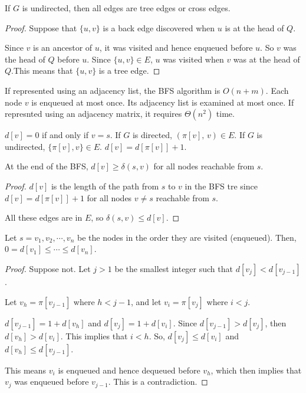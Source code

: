 \begin{lemma}
    If $G$ is undirected, then all edges are tree edges or cross edges.
\end{lemma}

\begin{proof}
    Suppose that $\{u,v\}$ is a back edge discovered when $u$ is at the head of $Q$.

    Since $v$ is an ancestor of $u$, it was visited and hence enqueued before $u$. So $v$ was the head of $Q$ before $u$. Since $\{u,v\} \in E$, $u$ was visited when $v$ was at the head of $Q$.This means that $\{u,v\}$ is a tree edge.
\end{proof}

If represented using an adjacency list, the BFS algorithm is $O(n+m)$. Each node $v$ is enqueued at most once. Its adjacency list is examined at most once. If represnted using an adjacency matrix, it requires $\Theta(n^2)$ time.

$d[v]=0$ if and only if $v=s$. If $G$ is directed, $(\pi[v],\, v) \in E$. If $G$ is undirected, $\{ \pi[v], v \} \in E$. $d[v] = d[\pi[v]]+1$.

\begin{lemma}
    At the end of the BFS, $d[v] \geq \delta(s,v)$ for all nodes reachable from $s$.
\end{lemma}

\begin{proof}
    $d[v]$ is the length of the path from $s$ to $v$ in the BFS tre since $d[v] = d[\pi[v]] + 1$ for all nodes $v \neq s$ reachable from $s$.

    All these edges are in $E$, so $\delta(s,v) \leq d[v]$.
\end{proof}

\begin{lemma}
    Let $s=v_1,v_2,\cdots,v_n$ be the nodes in the order they are visited (enqueued). Then, $0=d[v_1] \leq \cdots \leq d[v_n]$. 
\end{lemma}

\begin{proof}
    Suppose not. Let $j>1$ be the smallest integer such that $d[v_j]<d[v_{j-1}]$.
    
    Let $v_h = \pi[v_{j-1}]$ where $h < j-1$, and let $v_i = \pi[v_j]$ where $i < j$.
    
    $d[v_{j-1}] = 1 + d[v_{h}]$ and $d[v_j] = 1 + d[v_i]$. Since $d[v_{j-1}] > d[v_j]$, then $d[v_h] > d[v_i]$. This implies that $i<h$. So, $d[v_j] \leq d[v_i]$ and $d[v_h] \leq d[v_{j-1}]$.

    This means $v_i$ is enqueued and hence dequeued before $v_h$, which then implies that $v_j$ was enqueued before $v_{j-1}$. This is a contradiction.
\end{proof}

